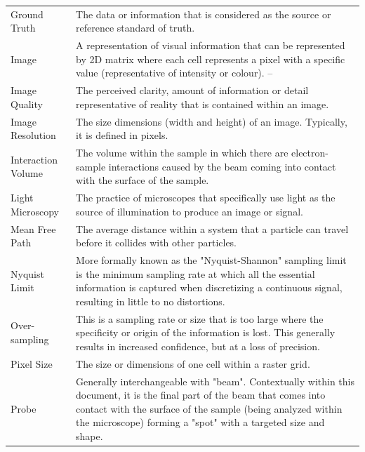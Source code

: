 \documentclass[12pt]{article}
\begin{document}
\begin{center}
\begin{longtable}{p{4.25cm} p{11.25cm}}
        Ground Truth & The data or information that is considered as the source or reference standard of truth. \\
        
        Image & A representation of visual information that can be represented by 2D matrix where each cell represents a pixel with a specific value (representative of intensity or colour). -- \\
        
        Image Quality & The perceived clarity, amount of information or detail representative of reality that is contained within an image. \\
        
        Image Resolution & The size dimensions (width and height) of an image. Typically, it is defined in pixels. \\
        
        Interaction Volume & The volume within the sample in which there are electron-sample interactions caused by the beam coming into contact with the surface of the sample. \\
        
        Light Microscopy & The practice of microscopes that specifically use light as the source of illumination to produce an image or signal. \\

        Mean Free Path & The average distance within a system that a particle can travel before it collides with other particles.\\
        
        Nyquist Limit & More formally known as the "Nyquist-Shannon" sampling limit is the minimum sampling rate at which all the essential information is captured when discretizing a continuous signal, resulting in little to no distortions. \\
        
        Over-sampling & This is a sampling rate or size that is too large where the specificity or origin of the information is lost. This generally results in increased confidence, but at a loss of precision.\\
        
        Pixel Size & The size or dimensions of one cell within a raster grid. \\
        
        Probe & Generally interchangeable with "beam". Contextually within this document, it is the final part of the beam that comes into contact with the surface of the sample (being analyzed within the microscope) forming a "spot" with a targeted size and shape. \\
        

\end{longtable}
\end{center}
\end{document}
